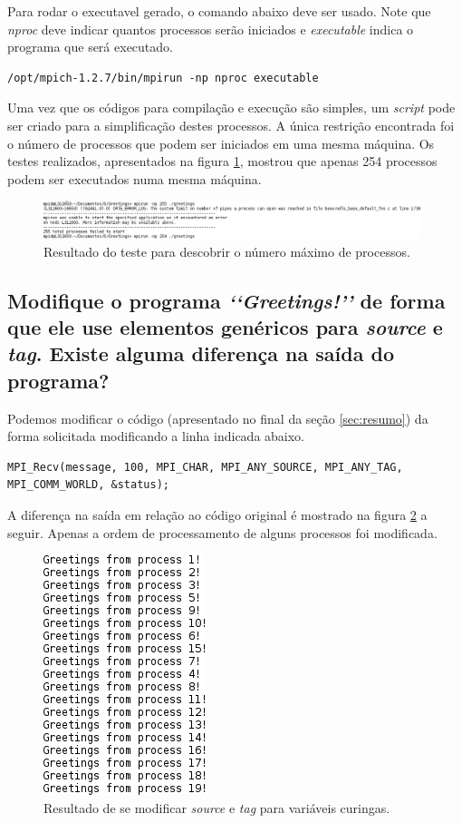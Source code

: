 \documentclass[11pt,a4paper,onecolumn]{article}
\begin{document}
Para rodar o executavel gerado, o comando abaixo deve ser usado. Note que \textit{nproc} deve indicar quantos processos serão iniciados e \textit{executable} indica o programa que será executado.
\begin{lstlisting}[style=cbash]
/opt/mpich-1.2.7/bin/mpirun -np nproc executable
\end{lstlisting}

Uma vez que os códigos para compilação e execução são simples, um \textit{script} pode ser criado para a simplificação destes processos. A única restrição encontrada foi o número de processos que podem ser iniciados em uma mesma máquina. Os testes realizados, apresentados na figura \ref{fig:ex1}, mostrou que apenas 254 processos podem ser executados numa mesma máquina.

\begin{figure}[h!]
  \centering
\includegraphics[width=0.98\textwidth,trim=0cm 0cm 14cm 0cm,clip=true]{../ex1/MaxProc}
  \caption{Resultado do teste para descobrir o número máximo de processos.}
  \label{fig:ex1}
\end{figure}

\subsection{Modifique o programa \textit{\lq\lq{}Greetings!\rq\rq{}} de forma que ele use elementos genéricos para \textit{source} e \textit{tag}. Existe alguma diferença na saída do programa?}
Podemos modificar o código (apresentado no final da seção \ref{sec:resumo}) da forma solicitada modificando a linha indicada abaixo. 
\begin{lstlisting}[style=cc,firstnumber=24]
MPI_Recv(message, 100, MPI_CHAR, MPI_ANY_SOURCE, MPI_ANY_TAG, MPI_COMM_WORLD, &status);
\end{lstlisting}

A diferença na saída em relação ao código original é mostrado na figura \ref{fig:ex2} a seguir. Apenas a ordem de processamento de alguns processos foi modificada.
\begin{figure}[h!]
  \centering
  \includegraphics[]{../ex2/Resultado}
  \caption{Resultado de se modificar \textit{source} e \textit{tag} para variáveis curingas.}
  \label{fig:ex2}
\end{figure}
\end{document}
